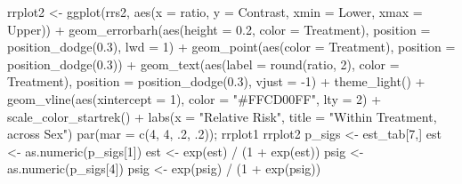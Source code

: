 \documentclass[12pt]{article}
\newenvironment{Shaded}{\begin{snugshade}}{\end{snugshade}}
\newcommand{\AttributeTok}[1]{\textcolor[rgb]{0.77,0.63,0.00}{#1}}
\newcommand{\DecValTok}[1]{\textcolor[rgb]{0.00,0.00,0.81}{#1}}
\newcommand{\FloatTok}[1]{\textcolor[rgb]{0.00,0.00,0.81}{#1}}
\newcommand{\FunctionTok}[1]{\textcolor[rgb]{0.00,0.00,0.00}{#1}}
\newcommand{\NormalTok}[1]{#1}
\newcommand{\OtherTok}[1]{\textcolor[rgb]{0.56,0.35,0.01}{#1}}
\newcommand{\SpecialCharTok}[1]{\textcolor[rgb]{0.00,0.00,0.00}{#1}}
\newcommand{\StringTok}[1]{\textcolor[rgb]{0.31,0.60,0.02}{#1}}
\begin{document}
\begin{Shaded}
\begin{Highlighting}[]
\NormalTok{rrplot2 }\OtherTok{\textless{}{-}} \FunctionTok{ggplot}\NormalTok{(rrs2, }\FunctionTok{aes}\NormalTok{(}\AttributeTok{x =}\NormalTok{ ratio, }\AttributeTok{y =}\NormalTok{ Contrast, }\AttributeTok{xmin =}\NormalTok{ Lower, }\AttributeTok{xmax =}\NormalTok{ Upper)) }\SpecialCharTok{+}
  \FunctionTok{geom\_errorbarh}\NormalTok{(}\FunctionTok{aes}\NormalTok{(}\AttributeTok{height =} \FloatTok{0.2}\NormalTok{, }\AttributeTok{color =}\NormalTok{ Treatment),}
                 \AttributeTok{position =} \FunctionTok{position\_dodge}\NormalTok{(}\FloatTok{0.3}\NormalTok{), }\AttributeTok{lwd =} \DecValTok{1}\NormalTok{) }\SpecialCharTok{+}
  \FunctionTok{geom\_point}\NormalTok{(}\FunctionTok{aes}\NormalTok{(}\AttributeTok{color =}\NormalTok{ Treatment), }\AttributeTok{position =} \FunctionTok{position\_dodge}\NormalTok{(}\FloatTok{0.3}\NormalTok{)) }\SpecialCharTok{+}
  \FunctionTok{geom\_text}\NormalTok{(}\FunctionTok{aes}\NormalTok{(}\AttributeTok{label =} \FunctionTok{round}\NormalTok{(ratio, }\DecValTok{2}\NormalTok{), }\AttributeTok{color =}\NormalTok{ Treatment), }
            \AttributeTok{position =} \FunctionTok{position\_dodge}\NormalTok{(}\FloatTok{0.3}\NormalTok{), }\AttributeTok{vjust =} \SpecialCharTok{{-}}\DecValTok{1}\NormalTok{) }\SpecialCharTok{+}
  \FunctionTok{theme\_light}\NormalTok{() }\SpecialCharTok{+}
  \FunctionTok{geom\_vline}\NormalTok{(}\FunctionTok{aes}\NormalTok{(}\AttributeTok{xintercept =} \DecValTok{1}\NormalTok{), }\AttributeTok{color =} \StringTok{"\#FFCD00FF"}\NormalTok{, }\AttributeTok{lty =} \DecValTok{2}\NormalTok{) }\SpecialCharTok{+}
  \FunctionTok{scale\_color\_startrek}\NormalTok{() }\SpecialCharTok{+}
  \FunctionTok{labs}\NormalTok{(}\AttributeTok{x =} \StringTok{"Relative Risk"}\NormalTok{, }\AttributeTok{title =} \StringTok{"Within Treatment, across Sex"}\NormalTok{)}
\FunctionTok{par}\NormalTok{(}\AttributeTok{mar =} \FunctionTok{c}\NormalTok{(}\DecValTok{4}\NormalTok{, }\DecValTok{4}\NormalTok{, .}\DecValTok{2}\NormalTok{, .}\DecValTok{2}\NormalTok{));}
\NormalTok{rrplot1}
\NormalTok{rrplot2}
\NormalTok{p\_sigs }\OtherTok{\textless{}{-}}\NormalTok{ est\_tab[}\DecValTok{7}\NormalTok{,]}
\NormalTok{est }\OtherTok{\textless{}{-}} \FunctionTok{as.numeric}\NormalTok{(p\_sigs[}\DecValTok{1}\NormalTok{])}
\NormalTok{est }\OtherTok{\textless{}{-}} \FunctionTok{exp}\NormalTok{(est) }\SpecialCharTok{/}\NormalTok{ (}\DecValTok{1} \SpecialCharTok{+} \FunctionTok{exp}\NormalTok{(est)) }
\NormalTok{psig }\OtherTok{\textless{}{-}} \FunctionTok{as.numeric}\NormalTok{(p\_sigs[}\DecValTok{4}\NormalTok{])}
\NormalTok{psig }\OtherTok{\textless{}{-}} \FunctionTok{exp}\NormalTok{(psig) }\SpecialCharTok{/}\NormalTok{ (}\DecValTok{1} \SpecialCharTok{+} \FunctionTok{exp}\NormalTok{(psig))}

\end{Highlighting}
\end{Shaded}
\end{document}

